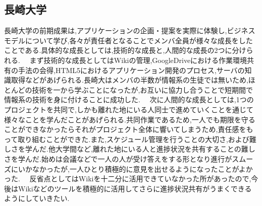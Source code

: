 \subsection{長崎大学}
\par
長崎大学の前期成果は,アプリケーションの企画・提案を実際に体験し,ビジネスモデルについて学び,各々が責任者となることでメンバ全員が様々な成長をしたことである.具体的な成長としては,技術的な成長と,人間的な成長の2つに分けられる.
　まず技術的な成長としてはWikiの管理,GoogleDriveにおける作業環境共有の手法の会得,HTML5におけるアプリケーション開発のプロセス,サーバの知識取得などがあげられる.長崎大はメンバの半数が情報系の生徒では無いため,ほとんどの技術を一から学ぶことになったが,お互いに協力し合うことで短期間で情報系の技術を身に付けることに成功した.
　次に人間的な成長としては,1つのプロジェクトを共同で,しかも離れた地にいる人同士で進めていくことを通じて様々なことを学んだことがあげられる.共同作業であるため,一人でも期限を守ることができなかったらそれがプロジェクト全体に響いてしまうため,責任感をもって取り組むことができた.また,スケジュール管理を行うことの大切さ,および難しさを学んだ.他大学間など,離れた地にいる人と進捗状況を共有することの難しさを学んだ.始めは会議などで一人の人が受け答えをする形となり進行がスムーズにいかなかったが,一人ひとり積極的に意見を出せるようになったことがよかった.
　反省点としてはWikiを十二分に活用できていなかった所があったので,今後はWikiなどのツールを積極的に活用してさらに進捗状況共有がうまくできるようにしていきたい.

